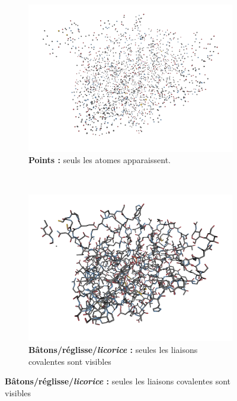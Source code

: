 	
	\newcommand{\subImgW}{0.32\textwidth}
	\newcommand{\subImgWinside}{0.36\textwidth}
	\begin{figure}[htb]
		\begin{subfigure}[t]{\subImgW}
			\centering
			\includegraphics[width=\textwidth]{./figures/ch1/4awn_points}
			\caption[Représentation en points]{\textbf{Points :} seuls les atomes apparaissent.}
			\label{fig:4awn_points}
		\end{subfigure}
		~
		\begin{subfigure}[t]{\subImgW}
			\centering
			\includegraphics[width=\textwidth]{./figures/ch1/4awn_licorice}
			\caption[Représentation en réglisse]{\textbf{Bâtons/réglisse/\emph{licorice} :} seules les liaisons covalentes sont visibles}
			\label{fig:4awn_licorice}
		\end{subfigure}

\end{figure}
